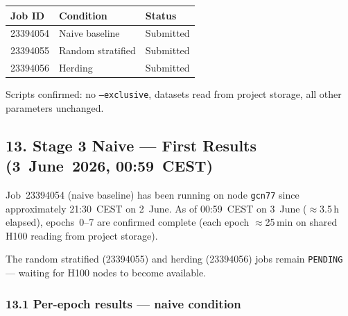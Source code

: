 \begin{center}\small
\begin{tabular}{lll}
\hline
\textbf{Job ID} & \textbf{Condition} & \textbf{Status} \\
\hline
23394054 & Naive baseline        & Submitted \\
23394055 & Random stratified     & Submitted \\
23394056 & Herding               & Submitted \\
\hline
\end{tabular}
\end{center}

\noindent Scripts confirmed: no \texttt{--exclusive}, datasets read from
project storage, all other parameters unchanged.

\subsection*{13. Stage 3 Naive — First Results (3~June~2026, 00:59~CEST)}

Job~23394054 (naive baseline) has been running on node \texttt{gcn77}
since approximately 21:30~CEST on 2~June. As of 00:59~CEST on
3~June ($\approx$3.5\,h elapsed), epochs~0--7 are confirmed
complete (each epoch $\approx$25\,min on shared H100 reading from
project storage).

The random stratified (23394055) and herding (23394056) jobs remain
\texttt{PENDING} — waiting for H100 nodes to become available.

\subsubsection*{13.1 Per-epoch results — naive condition}

